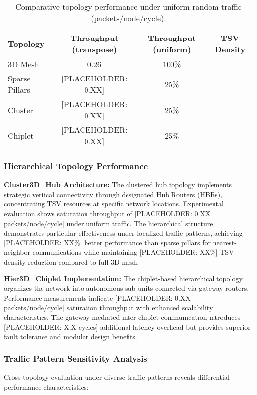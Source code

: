 \documentclass[11pt]{article}
\begin{document}
\begin{table}[htbp]
\centering
\caption{Comparative topology performance under uniform random traffic (packets/node/cycle).}
\label{tab:topology-performance-comparison}
\begin{tabular}{lccc}
\toprule
\textbf{Topology} & \textbf{Throughput (transpose)} & \textbf{Throughput (uniform)} & \textbf{TSV Density} \\
\midrule
3D Mesh  & 0.26 &  100\% \\
Sparse Pillars & [PLACEHOLDER: 0.XX] & 25\% \\
Cluster & [PLACEHOLDER: 0.XX] & 25\% \\
Chiplet & [PLACEHOLDER: 0.XX] & 25\% \\
\bottomrule
\end{tabular}
\end{table}

\subsubsection{Hierarchical Topology Performance}

\textbf{Cluster3D\_Hub Architecture:} The clustered hub topology implements strategic vertical connectivity through designated Hub Routers (HBRs), concentrating TSV resources at specific network locations. Experimental evaluation shows saturation throughput of [PLACEHOLDER: 0.XX packets/node/cycle] under uniform traffic. The hierarchical structure demonstrates particular effectiveness under localized traffic patterns, achieving [PLACEHOLDER: XX\%] better performance than sparse pillars for nearest-neighbor communications while maintaining [PLACEHOLDER: XX\%] TSV density reduction compared to full 3D mesh.

\textbf{Hier3D\_Chiplet Implementation:} The chiplet-based hierarchical topology organizes the network into autonomous sub-units connected via gateway routers. Performance measurements indicate [PLACEHOLDER: 0.XX packets/node/cycle] saturation throughput with enhanced scalability characteristics. The gateway-mediated inter-chiplet communication introduces [PLACEHOLDER: X.X cycles] additional latency overhead but provides superior fault tolerance and modular design benefits.

\subsubsection{Traffic Pattern Sensitivity Analysis}

Cross-topology evaluation under diverse traffic patterns reveals differential performance characteristics:
\end{document}
